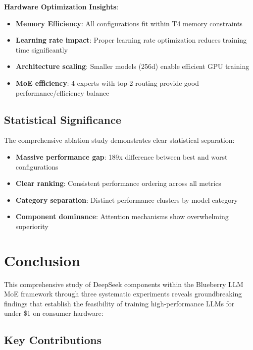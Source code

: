 \documentclass[11pt,a4paper]{article}
\begin{document}
\textbf{Hardware Optimization Insights}:
\begin{itemize}
    \item \textbf{Memory Efficiency}: All configurations fit within T4 memory constraints
    \item \textbf{Learning rate impact}: Proper learning rate optimization reduces training time significantly
    \item \textbf{Architecture scaling}: Smaller models (256d) enable efficient GPU training
    \item \textbf{MoE efficiency}: 4 experts with top-2 routing provide good performance/efficiency balance
\end{itemize}

\subsection{Statistical Significance}

The comprehensive ablation study demonstrates clear statistical separation:
\begin{itemize}
    \item \textbf{Massive performance gap}: 189x difference between best and worst configurations
    \item \textbf{Clear ranking}: Consistent performance ordering across all metrics
    \item \textbf{Category separation}: Distinct performance clusters by model category
    \item \textbf{Component dominance}: Attention mechanisms show overwhelming superiority
\end{itemize}

\section{Conclusion}

This comprehensive study of DeepSeek components within the Blueberry LLM MoE framework through three systematic experiments reveals groundbreaking findings that establish the feasibility of training high-performance LLMs for under \$1 on consumer hardware:

\subsection{Key Contributions}
\end{document}
